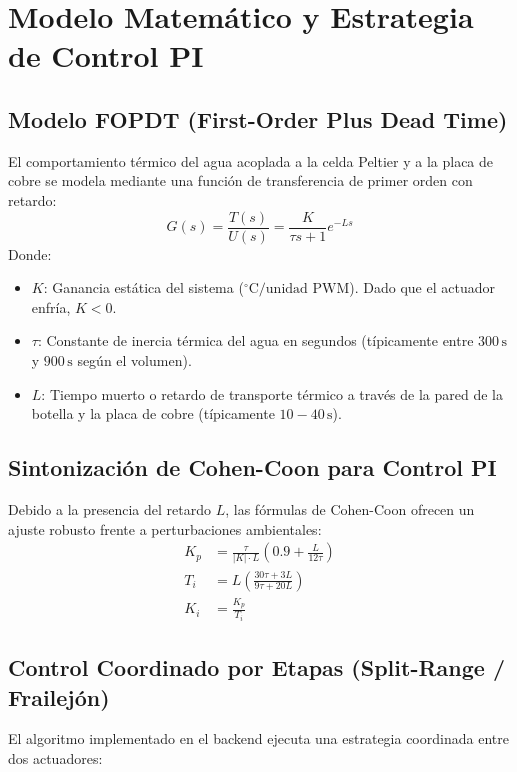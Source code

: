 \documentclass[11pt,letterpaper]{article}
\begin{document}
\section{Modelo Matemático y Estrategia de Control PI}

\subsection{Modelo FOPDT (First-Order Plus Dead Time)}
El comportamiento térmico del agua acoplada a la celda Peltier y a la placa de cobre se modela mediante una función de transferencia de primer orden con retardo:
\begin{equation}
    G(s) = \frac{T(s)}{U(s)} = \frac{K}{\tau s + 1} e^{-L s}
\end{equation}
Donde:
\begin{itemize}
    \item $K$: Ganancia estática del sistema ($^\circ\text{C} / \text{unidad PWM}$). Dado que el actuador enfría, $K < 0$.
    \item $\tau$: Constante de inercia térmica del agua en segundos (típicamente entre $300\,\text{s}$ y $900\,\text{s}$ según el volumen).
    \item $L$: Tiempo muerto o retardo de transporte térmico a través de la pared de la botella y la placa de cobre (típicamente $10 - 40\,\text{s}$).
\end{itemize}

\subsection{Sintonización de Cohen-Coon para Control PI}
Debido a la presencia del retardo $L$, las fórmulas de Cohen-Coon ofrecen un ajuste robusto frente a perturbaciones ambientales:
\begin{align}
    K_p &= \frac{\tau}{|K| \cdot L} \left( 0.9 + \frac{L}{12\tau} \right) \\
    T_i &= L \left( \frac{30\tau + 3L}{9\tau + 20L} \right) \\
    K_i &= \frac{K_p}{T_i}
\end{align}

\subsection{Control Coordinado por Etapas (Split-Range / Frailejón)}
El algoritmo implementado en el backend ejecuta una estrategia coordinada entre dos actuadores:
\end{document}
